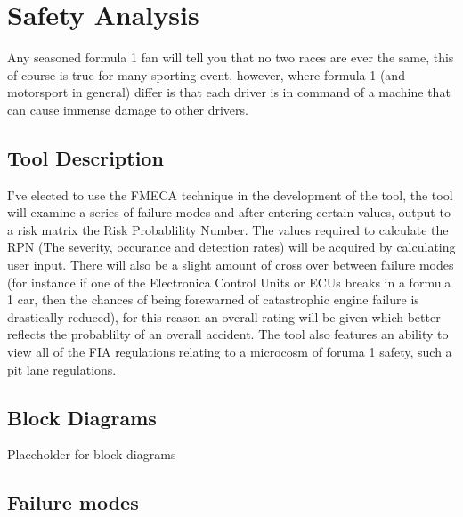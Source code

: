 \documentclass[12pt]{article} %
\begin{document}



\section{Safety Analysis} %

Any seasoned formula 1 fan will tell you that no two races are ever the same, this of course is true for many sporting event, however, where formula 1 (and motorsport in general) differ is that each driver is in command of a machine that can cause immense damage to other drivers.


\subsection{Tool Description}

I've elected to use the FMECA technique in the development of the tool, the tool will examine a series of failure modes and after entering certain values, output to a risk matrix the Risk Probablility Number. The values required to calculate the RPN (The severity, occurance and detection rates) will be acquired by calculating user input. There will also be a slight amount of cross over between failure modes (for instance if one of the Electronica Control Units or ECUs breaks in a formula 1 car, then the chances of being forewarned of catastrophic engine failure is drastically reduced), for this reason an overall rating will be given which better reflects the probablilty of an overall accident. The tool also features an ability to view all of the FIA regulations relating to a microcosm of foruma 1 safety, such a pit lane regulations.

\subsection{Block Diagrams}

Placeholder for block diagrams

\subsection{Failure modes}
\end{document}
